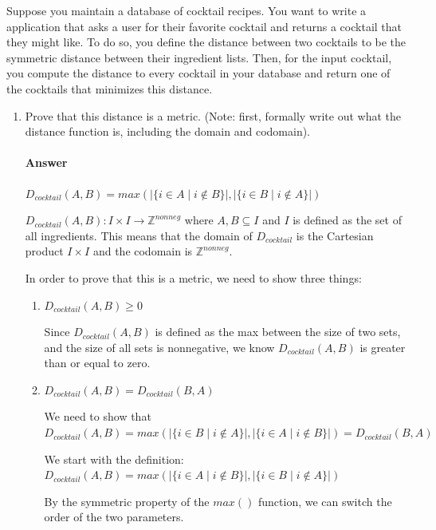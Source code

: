 \documentclass{article}
\begin{document}
Suppose you maintain a database of cocktail recipes.  You want to write a
application that asks a user for their favorite cocktail and returns a cocktail
that they might like.  To do so, you define the distance between two cocktails
to be the symmetric distance between their ingredient lists.  Then, for the
input cocktail, you compute the distance to every cocktail in your database and
return one of the cocktails that minimizes this distance.

\begin{enumerate}

    \item Prove that this distance is a metric. (Note: first, formally write out
        what the distance function is, including the domain and codomain).

        \paragraph{Answer}
        $D_{cocktail}(A, B) = max(|\{ i \in A \mid i \notin B\}|, |\{ i \in B \mid i \notin A\}|)$
       
       $D_{cocktail}(A, B)\colon I\times I\to \mathbb{Z}^{nonneg}$ where $A, B \subseteq I$ 
       and $I$ is defined as the set of all ingredients. This means that the domain of $D_{cocktail}$ is the Cartesian product $I\times I$ and the codomain is $\mathbb{Z}^{nonneg}$.
       
       In order to prove that this is a metric, we need to show three things:
       \begin{enumerate}
       
       \item $D_{cocktail}(A, B) \geq 0$
       
       Since $D_{cocktail}(A, B)$ is defined as the max between the size of two sets, and the size of all sets is nonnegative, we know $D_{cocktail}(A, B)$ is greater than or equal to zero.
       
       \item $D_{cocktail}(A, B) = D_{cocktail}(B, A)$
       
       We need to show that  $D_{cocktail}(A, B) = max(|\{ i \in B \mid i \notin A\}|, |\{ i \in A \mid i \notin B\}|) = D_{cocktail}(B, A)$
       
       We start with the definition:  $D_{cocktail}(A, B) =max(|\{ i \in A \mid i \notin B\}|, |\{ i \in B \mid i \notin A\}|)$
       
       By the symmetric property of the $max()$ function, we can switch the order of the two parameters.
       

\end{enumerate}
\end{enumerate}
\end{document}
